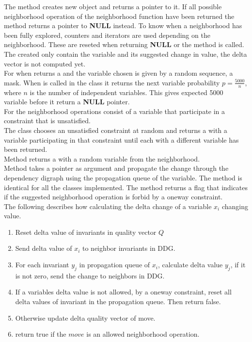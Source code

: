 The method  creates new  object and returns a pointer to it. If all possible neighborhood 
operation of the neighborhood function have been returned the method returns a pointer to \textbf{NULL} instead. To know 
when  a neighborhood has been fully explored, counters and iterators are used depending on the neighborhood. These are 
reseted when returning \textbf{NULL} or the method  is called. The  created only 
contain the variable and its suggested change in value, the delta vector is not computed yet. \\ 
For  when  returns a  and the variable chosen is given by a random 
sequence, a mask.  When  is called in the  class it returns the next variable 
probability $p = \frac{5000}{n}$, where $n$ is the number of independent variables. This gives expected 5000 variable 
before it return a \textbf{NULL} pointer. \\
For  the neighborhood operations consist of a variable that participate in a constraint that is 
unsatisfied. \\ 
The class  chooses an unsatisfied constraint at random and returns a  with 
a variable participating in that constraint until each  with a different variable has been returned. \\
Method  returns a  with a random variable from the neighborhood.  \\ 
Method  takes a  pointer as argument and propagate the change through the 
dependency digraph using the propagation queue of the variable. The method is identical for all the 
 classes implemented. The method returns a flag that indicates if the suggested 
neighborhood operation is forbid by a oneway constraint. \\ 
The following describes how calculating the delta change of a variable $x_i$ changing value. 
\begin{enumerate} 
 \item Reset delta value of invariants in quality vector $Q$
 \item Send delta value of $x_i$ to neighbor invariants in DDG.
 \item For each invariant $y_j$ in propagation queue of $x_i$, calculate delta value $y_j$, if it is not zero, send 
the change to neighbors in DDG. 
 \item If a variables delta value is not allowed, by a oneway constraint, reset all delta values of invariant in 
the propagation queue. Then return false. 
 \item Otherwise update delta quality vector of move. 
\item return true if the $move$ is an allowed neighborhood operation. 
\end{enumerate} \noindent
